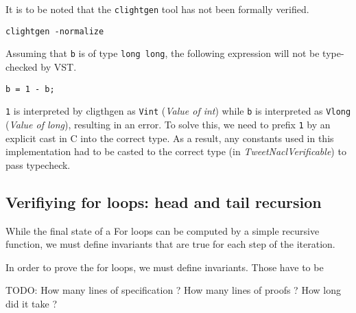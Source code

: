 It is to be noted that the \texttt{clightgen} tool has not been formally verified.

\texttt{clightgen -normalize}

Assuming that \texttt{b} is of type \texttt{long long}, the following expression
will not be type-checked by VST.

\texttt{b = 1 - b;}

\texttt{1} is interpreted by cligthgen as \texttt{Vint} (\textit{Value of int})
while \texttt{b} is interpreted as \texttt{Vlong} (\textit{Value of long}),
resulting in an error. To solve this, we need to prefix \texttt{1} by an
explicit cast in C into the correct type. As a result, any constants used in this
implementation had to be casted to the correct type
(in \textit{TweetNaclVerificable}) to pass typecheck.

\subsection{Verifiying for loops: head and tail recursion}

While the final state of a For loops can be computed by a simple recursive function,
we must define invariants that are true for each step of the iteration.



In order to prove the for loops, we must define invariants.
Those have to be


TODO:
How many lines of specification ?
How many lines of proofs ?
How long did it take ?
